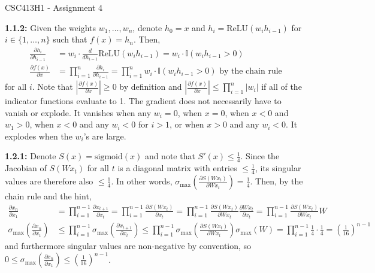 \documentclass[12pt]{article}
\begin{document}
\begin{center}
{\Large CSC413H1 - Assignment 4}
\end{center}

\textbf{1.1.2:} Given the weights $w_1,\ldots,w_n$, denote $h_0 = x$ and $h_i = \text{ReLU}(w_ih_{i-1})$ for $i\in\{1,\ldots,n\}$ such that $f(x) = h_n$. Then, \begin{align*}
    \frac{\partial h_i}{\partial h_{i-1}} &= w_i \cdot \frac{d}{dh_{i-1}} \text{ReLU}(w_ih_{i-1}) = w_i \cdot \mathbb{I}(w_ih_{i-1}>0)\\
    \frac{\partial f(x)}{\partial x} &= \prod_{i=1}^n \frac{\partial h_i}{\partial h_{i-1}} = \prod_{i=1}^n w_i \cdot \mathbb{I}(w_ih_{i-1}>0) \text{ by the chain rule}
\end{align*} for all $i$. Note that $|\frac{\partial f(x)}{\partial x}| \geq 0$ by definition and $|\frac{\partial f(x)}{\partial x}| \leq \prod_{i=1}^n |w_i|$ if all of the indicator functions evaluate to 1. The gradient does not necessarily have to vanish or explode. It vanishes when any $w_i = 0$, when $x=0$, when $x<0$ and $w_1>0$, when $x<0$ and any $w_i<0$ for $i>1$, or when $x>0$ and any $w_i<0$. It explodes when the $w_i$'s are large.

\textbf{1.2.1:} Denote $S(x) = \text{sigmoid}(x)$ and note that $S'(x) \leq \frac{1}{4}$. Since the Jacobian of $S(Wx_t)$ for all $t$ is a diagonal matrix with entries $\leq\frac{1}{4}$, its singular values are therefore also $\leq\frac{1}{4}$. In other words, $\sigma_{\text{max}}(\frac{\partial S(Wx_t)}{\partial Wx_t}) = \frac{1}{4}$. Then, by the chain rule and the hint, \begin{align*}
    \frac{\partial x_n}{\partial x_1} &= \prod_{i=1}^{n-1} \frac{\partial x_{t+1}}{\partial x_t} = \prod_{i=1}^{n-1} \frac{\partial S(Wx_t)}{\partial x_t} = \prod_{i=1}^{n-1} \frac{\partial S(Wx_t)}{\partial Wx_t} \frac{\partial Wx_t}{\partial x_t} = \prod_{i=1}^{n-1} \frac{\partial S(Wx_t)}{\partial Wx_t}W\\
    \sigma_{\text{max}}(\frac{\partial x_n}{\partial x_1}) &\leq \prod_{i=1}^{n-1} \sigma_{\text{max}} (\frac{\partial x_{t+1}}{\partial x_t}) \leq \prod_{i=1}^{n-1} \sigma_{\text{max}}(\frac{\partial S(Wx_t)}{\partial Wx_t}) \sigma_{\text{max}}(W) = \prod_{i=1}^{n-1} \frac{1}{4} \cdot \frac{1}{4} = (\frac{1}{16})^{n-1}
\end{align*} and furthermore singular values are non-negative by convention, so $0\leq \sigma_{\text{max}}(\frac{\partial x_n}{\partial x_1})\leq (\frac{1}{16})^{n-1}$.
\end{document}

